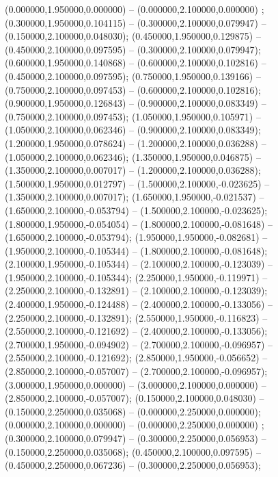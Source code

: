  (0.000000,1.950000,0.000000) -- (0.000000,2.100000,0.000000) ;
 (0.300000,1.950000,0.104115) -- (0.300000,2.100000,0.079947) -- (0.150000,2.100000,0.048030);
 (0.450000,1.950000,0.129875) -- (0.450000,2.100000,0.097595) -- (0.300000,2.100000,0.079947);
 (0.600000,1.950000,0.140868) -- (0.600000,2.100000,0.102816) -- (0.450000,2.100000,0.097595);
 (0.750000,1.950000,0.139166) -- (0.750000,2.100000,0.097453) -- (0.600000,2.100000,0.102816);
 (0.900000,1.950000,0.126843) -- (0.900000,2.100000,0.083349) -- (0.750000,2.100000,0.097453);
 (1.050000,1.950000,0.105971) -- (1.050000,2.100000,0.062346) -- (0.900000,2.100000,0.083349);
 (1.200000,1.950000,0.078624) -- (1.200000,2.100000,0.036288) -- (1.050000,2.100000,0.062346);
 (1.350000,1.950000,0.046875) -- (1.350000,2.100000,0.007017) -- (1.200000,2.100000,0.036288);
 (1.500000,1.950000,0.012797) -- (1.500000,2.100000,-0.023625) -- (1.350000,2.100000,0.007017);
 (1.650000,1.950000,-0.021537) -- (1.650000,2.100000,-0.053794) -- (1.500000,2.100000,-0.023625);
 (1.800000,1.950000,-0.054054) -- (1.800000,2.100000,-0.081648) -- (1.650000,2.100000,-0.053794);
 (1.950000,1.950000,-0.082681) -- (1.950000,2.100000,-0.105344) -- (1.800000,2.100000,-0.081648);
 (2.100000,1.950000,-0.105344) -- (2.100000,2.100000,-0.123039) -- (1.950000,2.100000,-0.105344);
 (2.250000,1.950000,-0.119971) -- (2.250000,2.100000,-0.132891) -- (2.100000,2.100000,-0.123039);
 (2.400000,1.950000,-0.124488) -- (2.400000,2.100000,-0.133056) -- (2.250000,2.100000,-0.132891);
 (2.550000,1.950000,-0.116823) -- (2.550000,2.100000,-0.121692) -- (2.400000,2.100000,-0.133056);
 (2.700000,1.950000,-0.094902) -- (2.700000,2.100000,-0.096957) -- (2.550000,2.100000,-0.121692);
 (2.850000,1.950000,-0.056652) -- (2.850000,2.100000,-0.057007) -- (2.700000,2.100000,-0.096957);
 (3.000000,1.950000,0.000000) -- (3.000000,2.100000,0.000000) -- (2.850000,2.100000,-0.057007);
 (0.150000,2.100000,0.048030) -- (0.150000,2.250000,0.035068) -- (0.000000,2.250000,0.000000);
 (0.000000,2.100000,0.000000) -- (0.000000,2.250000,0.000000) ;
 (0.300000,2.100000,0.079947) -- (0.300000,2.250000,0.056953) -- (0.150000,2.250000,0.035068);
 (0.450000,2.100000,0.097595) -- (0.450000,2.250000,0.067236) -- (0.300000,2.250000,0.056953);
